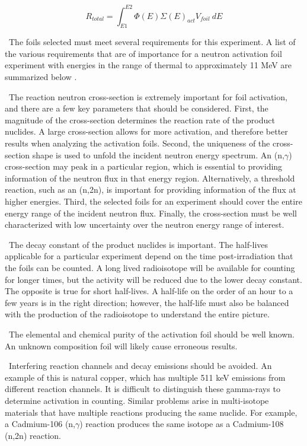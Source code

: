 \documentclass[journal]{IEEEtran}
\begin{document}
	\begin{equation} \label{eq:NIFrxnRate}
	R_{total} = \int_{E1}^{E2} \Phi(E) \Sigma(E) _{act} V_{foil} 
	\:dE 
	\end{equation}
	
	\ The foils selected must meet several requirements for this experiment. 
A list of the various requirements that are of importance for a neutron activation foil experiment with energies in the range of thermal to approximately 11 MeV are summarized below \cite{Knoll,Luciano2012a,Kuijpers1977}.
	
	\ The reaction neutron cross-section is extremely important for foil 
	activation, and there are a few key parameters that should be considered. 
	First, the magnitude of the cross-section determines the 
	reaction rate of the product nuclides. A large cross-section allows for 
	more activation, and therefore better results when analyzing the activation 
	foils. Second, the uniqueness of the cross-section shape is used to unfold 
	the incident neutron energy spectrum. An (n,$\gamma$) cross-section may 
	peak in a particular region, which is essential to providing information of the 
	neutron flux in that energy region. Alternatively, a threshold reaction, 
	such as an (n,2n), is important for providing information of the flux at 
	higher energies. Third, the selected foils for an experiment should cover  
	the entire energy range of the incident neutron flux. Finally, the cross-section
	must be well characterized with low uncertainty over the neutron energy range of 
	interest.
	
	\ The decay constant of the product nuclides is important. The 
	half-lives applicable for a particular experiment depend on the time 
	post-irradiation that the foils can be counted. A long lived radioisotope 
	will be available for counting for longer times, but the activity will be 
	reduced due to the lower decay constant. The opposite is true for short 
	half-lives. A half-life on the order of an hour to a few years is in the 
	right direction; however, the half-life must also be balanced with the 
	production of the radioisotope to understand the entire picture. 
	
	\ The elemental and chemical purity of the activation foil should be 
	well known. An unknown composition foil will likely cause erroneous 
	results. 
	
	\ Interfering reaction channels and decay emissions should be avoided. 
	An example of this is natural copper, which has multiple 511 keV emissions 
	from different reaction channels. It is difficult to distinguish these 
	gamma-rays to determine activation in counting. Similar problems arise in 
	multi-isotope materials that have multiple reactions producing the same 
	nuclide. For example, a Cadmium-106 (n,$\gamma$) reaction produces the same 
	isotope as a Cadmium-108 (n,2n) reaction. 
	
\end{document}
